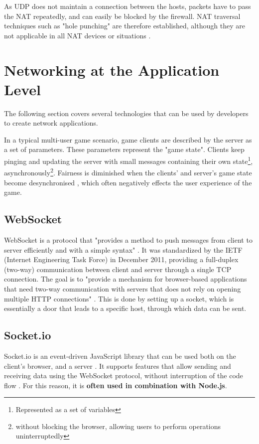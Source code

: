 \documentclass[bsc, 12pt, twoside, singlespacing, parskip, abbrevs, notimes, normalheadings, logo, deptreport]{styles/infthesis}
\begin{document}
As UDP does not maintain a connection between the hosts, packets have to pass the NAT repeatedly, and can easily be blocked by the firewall. 
NAT traversal techniques such as "hole punching" are therefore established, although they are not applicable in all NAT devices or situations \cite{udp_holepunching}.

\section{Networking at the Application Level}
The following section covers several technologies that can be used by developers to create network applications.

In a typical multi-user game scenario, game clients are described by the server as a set of parameters. These parameters represent the "game state". Clients keep pinging and updating the server with small messages containing their own state\footnote{Represented as a set of variables}, asynchronously\footnote{without blocking the browser, allowing users to perform operations uninterruptedly}. Fairness is diminished when the clients' and server's game state become desynchronised \cite{Fairness_and_Playability}, which often negatively effects the user experience of the game.

\subsection{WebSocket}
WebSocket is a protocol that "provides a method to push messages from client to server efficiently and with a simple syntax" \cite{WebSocket}. It was standardized by the IETF (Internet Engineering Task Force) in December 2011, providing a full-duplex (two-way) communication between client and server through a single TCP connection. The goal is to "provide a mechanism for browser-based applications that need two-way communication with servers that does not rely on opening multiple HTTP connections" \cite{websocket_communication}. This is done by setting up a socket, which is essentially a door that leads to a specific host, through which data can be sent.

\subsection{Socket.io}
Socket.io is an event-driven JavaScript library that can be used both on the client's browser, and a server \cite{Socketio}. It supports features that allow sending and receiving data using the WebSocket protocol, without interruption of the code flow \cite{Socketio_Benchmark, Socketio_TCP_Benchmark}. For this reason, it is \textbf{often used in combination with Node.js}.
\end{document}

